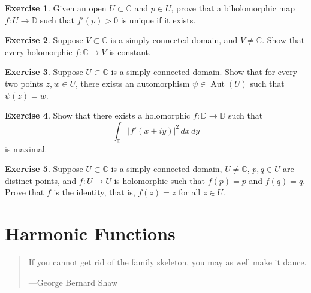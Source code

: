 \documentclass[12pt,openany]{book}
\newcommand{\Aut}{\operatorname{Aut}}
\newcommand{\abs}[1]{\left\lvert {#1} \right\rvert}
\newcommand{\C}{{\mathbb{C}}}
\newcommand{\D}{{\mathbb{D}}}
\theoremstyle{plain}
\theoremstyle{remark}
\theoremstyle{definition}
\newenvironment{exbox}{%
    \def\FrameCommand{\vrule width 1pt \relax\hspace{10pt}}%
    \MakeFramed{\advance\hsize-\width\FrameRestore}%
}{%
    \endMakeFramed
}
\newenvironment{myquote}{%
    \begin{quote}%
    \begingroup\itshape
}{%
    \endgroup%
    \end{quote}
}
\theoremstyle{exercise}
\newtheorem{exercise}{Exercise}[section]
\theoremstyle{example}
\begin{document}
\begin{exbox}
\begin{exercise}
Given an open $U \subset \C$ and $p \in U$, prove
that a biholomorphic map
$f \colon U \to \D$ such that $f'(p) > 0$ is unique if it exists.
\end{exercise}

\begin{exercise}
Suppose $V \subset \C$ is a simply connected domain, and $V \not= \C$.
Show that every holomorphic $f \colon \C \to V$ is constant.
\end{exercise}

\begin{exercise}
Suppose $U \subset \C$ is a simply connected domain.
Show that for every two points $z,w \in U$, there exists an automorphism
$\psi \in \Aut(U)$ such that $\psi(z) = w$.
\end{exercise}

\begin{exercise}
Show that there exists
a holomorphic $f \colon \D \to \D$ such that
\begin{equation*}
\int_{\D} \abs{f'(x+iy)}^2 \, dx \, dy
\end{equation*}
is maximal.
\end{exercise}

\begin{exercise}
Suppose $U \subset \C$ is a simply connected domain, $U \not= \C$,
$p,q \in U$ are distinct points, and
$f \colon U \to U$ is holomorphic such that $f(p) = p$ and $f(q)=q$.
Prove that $f$ is the identity, that is, $f(z)=z$ for all $z \in U$.
\end{exercise}
\end{exbox}


\chapter{Harmonic Functions} \label{ch:harmonic}

\begin{myquote}
If you cannot get rid of the family skeleton, you may as well make it
dance.

---George Bernard Shaw
\end{myquote}
\end{document}
